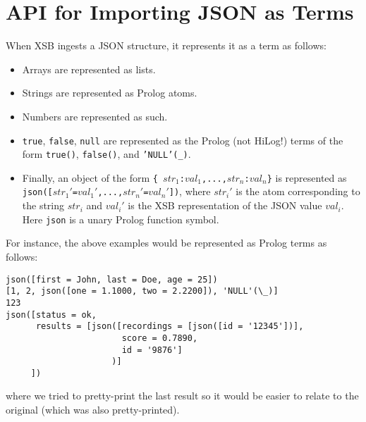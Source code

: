 \section{API for Importing JSON  as Terms}

When XSB ingests a JSON structure, it represents it as a term as follows:
\begin{itemize}
\item  Arrays are represented as lists.
\item  Strings are represented as Prolog atoms.
\item  Numbers are represented as such.
\item  \texttt{true}, \texttt{false}, \texttt{null} are represented as the
  Prolog (not HiLog!) terms of the form \texttt{true()},
  \texttt{false()}, and \texttt{'NULL'(\_)}.
\item Finally, an object of the form \texttt{\{
    $str_1$:$val_1$,...,$str_n$:$val_n$\}} is represented as
  \texttt{json([$str_1'$=$val_1'$,...,$str_n'$=$val_n'$])}, where
  $str_i'$ is the atom corresponding to the string $str_i$ and $val_i'$ is
  the XSB representation of the JSON value $val_i$.
  Here \texttt{json} is a unary Prolog function symbol.
\end{itemize}
For instance, the above examples would be represented as Prolog terms as follows:
\begin{verbatim}
json([first = John, last = Doe, age = 25])
[1, 2, json([one = 1.1000, two = 2.2200]), 'NULL'(\_)]
123
json([status = ok,
      results = [json([recordings = [json([id = '12345'])],
                       score = 0.7890,
                       id = '9876']
                     )]
     ])
\end{verbatim}
where we tried to pretty-print the last result so it would be easier to
relate to the original (which was also pretty-printed).

